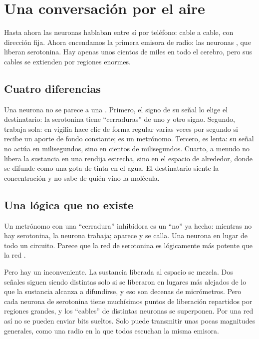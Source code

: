 \chapter{Una conversación por el aire}


Hasta ahora las neuronas hablaban entre sí por teléfono: cable a cable, con dirección fija. Ahora encendamos la primera emisora de radio: las neuronas , que liberan serotonina. Hay apenas unos cientos de miles en todo el cerebro, pero sus cables se extienden por regiones enormes.

\section*{Cuatro diferencias}

Una neurona  no se parece a una . Primero, el signo de su señal lo elige el destinatario: la serotonina tiene “cerraduras” de uno y otro signo. Segundo, trabaja sola: en vigilia hace clic de forma regular varias veces por segundo si recibe un aporte de fondo constante; es un metrónomo. Tercero, es lenta: su señal no actúa en milisegundos, sino en cientos de milisegundos. Cuarto, a menudo no libera la sustancia en una rendija estrecha, sino en el espacio de alrededor, donde se difunde como una gota de tinta en el agua. El destinatario siente la concentración y no sabe de quién vino la molécula.

\section*{Una lógica que no existe}

Un metrónomo con una “cerradura” inhibidora es un “no” ya hecho: mientras no hay serotonina, la neurona trabaja; aparece y se calla. Una neurona en lugar de todo un circuito. Parece que la red de serotonina es lógicamente más potente que la red .

Pero hay un inconveniente. La sustancia liberada al espacio se mezcla. Dos señales siguen siendo distintas solo si se liberaron en lugares más alejados de lo que la sustancia alcanza a difundirse, y eso son decenas de micrómetros. Pero cada neurona de serotonina tiene muchísimos puntos de liberación repartidos por regiones grandes, y los “cables” de distintas neuronas se superponen. Por una red así no se pueden enviar bits sueltos. Solo puede transmitir unas pocas magnitudes generales, como una radio en la que todos escuchan la misma emisora.

